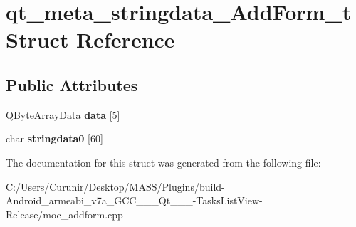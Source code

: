 \hypertarget{structqt__meta__stringdata___add_form__t}{}\section{qt\+\_\+meta\+\_\+stringdata\+\_\+\+Add\+Form\+\_\+t Struct Reference}
\label{structqt__meta__stringdata___add_form__t}
\subsection*{Public Attributes}
\begin{DoxyCompactItemize}
\item 
\mbox{\label{structqt__meta__stringdata___add_form__t_a5317b1f7dd678ac9b7051a47219fc553}} 
Q\+Byte\+Array\+Data {\bfseries data} \mbox{[}5\mbox{]}
\item 
\mbox{\label{structqt__meta__stringdata___add_form__t_a4ee775790f14664c559536f017edb59f}} 
char {\bfseries stringdata0} \mbox{[}60\mbox{]}
\end{DoxyCompactItemize}


The documentation for this struct was generated from the following file\+:\begin{DoxyCompactItemize}
\item 
C\+:/\+Users/\+Curunir/\+Desktop/\+M\+A\+S\+S/\+Plugins/build-\/\+Android\+\_\+armeabi\+\_\+v7a\+\_\+\+G\+C\+C\+\_\+\_\+\_\+\+Qt\+\_\+\_\+\_-\/\+Tasks\+List\+View-\/\+Release/moc\+\_\+addform.\+cpp\end{DoxyCompactItemize}
